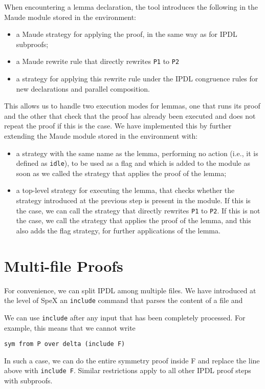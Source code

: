 \documentclass{article}
\begin{document}
When encountering a lemma declaration, the tool introduces the following 
in the Maude module stored in the environment:
\begin{itemize}
\item a Maude strategy for applying the proof, in the same way
as for IPDL subproofs;
\item a Maude rewrite rule that directly rewrites \verb+P1+ to \verb+P2+
\item a strategy for applying this rewrite rule under the IPDL congruence rules
for new declarations and parallel composition.
\end{itemize}

This allows us to handle two execution modes for lemmas, one that runs its proof and the other that check that the proof has already been executed and does not repeat the
proof if this is the case. We have implemented this by further extending the 
Maude module stored in the environment with:
\begin{itemize}
\item a strategy with the same name as the lemma, performing no action (i.e., it is defined as \verb+idle+), to be used as a flag and which is added to the module
as soon as we called the strategy that applies the proof of the lemma;
\item a top-level strategy for executing the lemma, that checks whether the 
strategy introduced at the previous step is present in the module. 
If this is the case,
we can call the strategy that directly rewrites \verb+P1+ to \verb+P2+. If this
is not the case, we call the strategy that applies the proof of the lemma, and
this also adds the flag strategy, for further applications of the lemma.
\end{itemize}

\section{Multi-file Proofs}

For convenience, we can split IPDL among multiple files. 
We have introduced at the level of SpeX an \verb+include+ command that
parses the content of a file and 

We can use \verb+include+ after any input that has been completely processed.
For example, this means that we cannot write
\begin{verbatim}
sym from P over delta (include F)
\end{verbatim}
\noindent In such a case, we can do the entire symmetry proof inside F and
replace the line above with \verb+include F+. Similar restrictions apply to
all other IPDL proof steps with subproofs.
\end{document}
